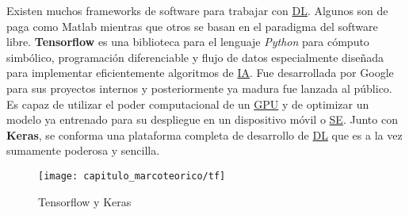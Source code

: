 Existen muchos frameworks de software para trabajar con \hyperlink{abbr}{DL}.
Algunos son de paga como Matlab mientras que otros se basan en el paradigma del
software libre. \textbf{Tensorflow} es una biblioteca para el lenguaje
\emph{Python} para cómputo simbólico, programación diferenciable y flujo de
datos especialmente diseñada para implementar eficientemente algoritmos de
\hyperlink{abbr}{IA}. Fue desarrollada por Google para sus proyectos internos y
posteriormente ya madura fue lanzada al público. Es capaz de utilizar el poder
computacional de un \hyperlink{abbr}{GPU} y de optimizar un modelo ya entrenado
para su despliegue en un dispositivo móvil o \hyperlink{abbr}{SE}. Junto con
\textbf{Keras}, se conforma una plataforma completa de desarrollo de \hyperlink{abbr}{DL} que es a
la vez sumamente poderosa y sencilla. 


\begin{figure}[H]
    \centering
    \texttt{[image: capitulo\_marcoteorico/tf]}
    \caption{Tensorflow y Keras}\label{fig:tf}
\end{figure}